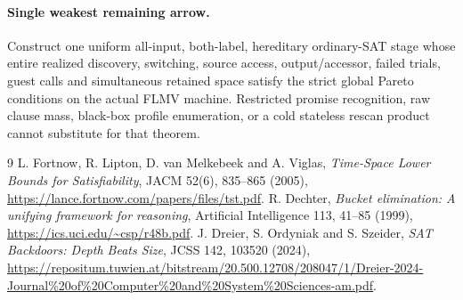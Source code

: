 \documentclass[11pt]{article}
\begin{document}
\paragraph{Single weakest remaining arrow.}
Construct one uniform all-input, both-label, hereditary ordinary-SAT stage whose
entire realized discovery, switching, source access, output/accessor, failed
trials, guest calls and simultaneous retained space satisfy the strict global
Pareto conditions on the actual FLMV machine.  Restricted promise recognition,
raw clause mass, black-box profile enumeration, or a cold stateless rescan
product cannot substitute for that theorem.

\begin{thebibliography}{9}
 L. Fortnow, R. Lipton, D. van Melkebeek and A. Viglas,
\emph{Time-Space Lower Bounds for Satisfiability}, JACM 52(6), 835--865 (2005),
\url{https://lance.fortnow.com/papers/files/tst.pdf}.
 R. Dechter, \emph{Bucket elimination: A unifying framework
for reasoning}, Artificial Intelligence 113, 41--85 (1999),
\url{https://ics.uci.edu/~csp/r48b.pdf}.
 J. Dreier, S. Ordyniak and S. Szeider,
\emph{SAT Backdoors: Depth Beats Size}, JCSS 142, 103520 (2024),
\url{https://repositum.tuwien.at/bitstream/20.500.12708/208047/1/Dreier-2024-Journal%20of%20Computer%20and%20System%20Sciences-am.pdf}.
\end{thebibliography}
\end{document}

